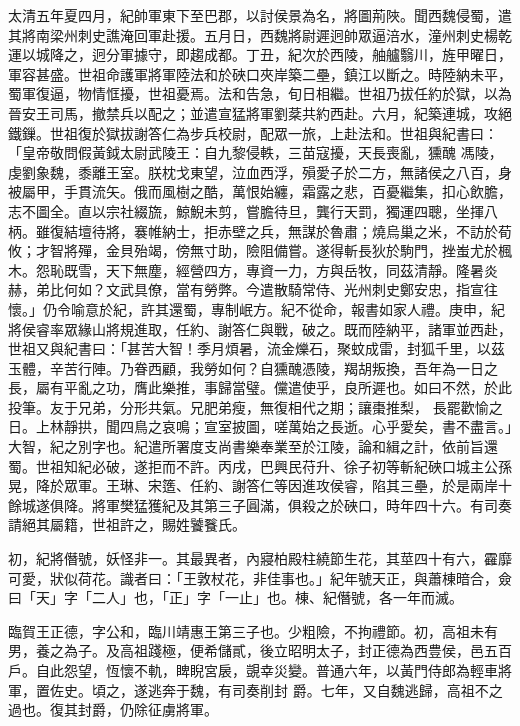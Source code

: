 \begin{pinyinscope}
 太清五年夏四月，紀帥軍東下至巴郡，以討侯景為名，將圖荊陜。聞西魏侵蜀，遣其將南梁州刺史譙淹回軍赴援。五月日，西魏將尉遲迥帥眾逼涪水，潼州刺史楊乾運以城降之，迥分軍據守，即趨成都。丁丑，紀次於西陵，舳艫翳川，旌甲曜日，軍容甚盛。世祖命護軍將軍陸法和於硤口夾岸築二壘，鎮江以斷之。時陸納未平，蜀軍復逼，物情恇擾，世祖憂焉。法和告急，旬日相繼。世祖乃拔任約於獄，以為晉安王司馬，撤禁兵以配之；並遣宣猛將軍劉棻共約西赴。六月，紀築連城，攻絕鐵鏁。世祖復於獄拔謝答仁為步兵校尉，配眾一旅，上赴法和。世祖與紀書曰：「皇帝敬問假黃鉞太尉武陵王：自九黎侵軼，三苗寇擾，天長喪亂，獯醜
 馮陵，虔劉象魏，黍離王室。朕枕戈東望，泣血西浮，殞愛子於二方，無諸侯之八百，身被屬甲，手貫流矢。俄而風樹之酷，萬恨始纏，霜露之悲，百憂繼集，扣心飲膽，志不圖全。直以宗社綴旒，鯨鯢未剪，嘗膽待旦，龔行天罰，獨運四聰，坐揮八柄。雖復結壇待將，褰帷納士，拒赤壁之兵，無謀於魯肅；燒烏巢之米，不訪於荀攸；才智將殫，金貝殆竭，傍無寸助，險阻備嘗。遂得斬長狄於駒門，挫蚩尤於楓木。怨恥既雪，天下無塵，經營四方，專資一力，方與岳牧，同茲清靜。隆暑炎赫，弟比何如？文武具僚，當有勞弊。今遣散騎常侍、光州刺史鄭安忠，指宣往懷。」仍令喻意於紀，許其還蜀，專制岷方。紀不從命，報書如家人禮。庚申，紀將侯睿率眾緣山將規進取，任約、謝答仁與戰，破之。既而陸納平，諸軍並西赴，世祖又與紀書曰：「甚苦大智！季月煩暑，流金爍石，聚蚊成雷，封狐千里，以茲玉體，辛苦行陣。乃眷西顧，我勞如何？自獯醜憑陵，羯胡叛換，吾年為一日之長，屬有平亂之功，膺此樂推，事歸當璧。儻遣使乎，良所遲也。如曰不然，於此投筆。友于兄弟，分形共氣。兄肥弟瘦，無復相代之期；讓棗推梨，
 長罷歡愉之日。上林靜拱，聞四鳥之哀鳴；宣室披圖，嗟萬始之長逝。心乎愛矣，書不盡言。」大智，紀之別字也。紀遣所署度支尚書樂奉業至於江陵，論和緝之計，依前旨還蜀。世祖知紀必破，遂拒而不許。丙戌，巴興民苻升、徐子初等斬紀硤口城主公孫晃，降於眾軍。王琳、宋簉、任約、謝答仁等因進攻侯睿，陷其三壘，於是兩岸十餘城遂俱降。將軍樊猛獲紀及其第三子圓滿，俱殺之於硤口，時年四十六。有司奏請絕其屬籍，世祖許之，賜姓饕餮氏。



 初，紀將僭號，妖怪非一。其最異者，內寢柏殿柱繞節生花，其莖四十有六，靃靡可愛，狀似荷花。識者曰：「王敦杖花，非佳事也。」紀年號天正，與蕭棟暗合，僉曰「天」字「二人」也，「正」字「一止」也。棟、紀僭號，各一年而滅。



 臨賀王正德，字公和，臨川靖惠王第三子也。少粗險，不拘禮節。初，高祖未有男，養之為子。及高祖踐極，便希儲貳，後立昭明太子，封正德為西豊侯，邑五百戶。自此怨望，恆懷不軌，睥睨宮扆，覬幸災變。普通六年，以黃門侍郎為輕車將軍，置佐史。頃之，遂逃奔于魏，有司奏削封
 爵。七年，又自魏逃歸，高祖不之過也。復其封爵，仍除征虜將軍。




\end{pinyinscope}
